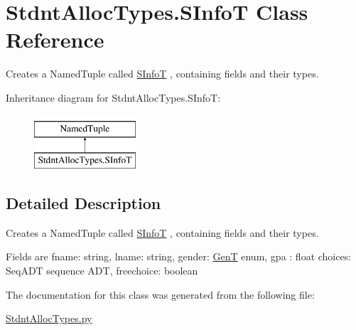 \hypertarget{class_stdnt_alloc_types_1_1_s_info_t}{}\section{Stdnt\+Alloc\+Types.\+S\+InfoT Class Reference}
\label{class_stdnt_alloc_types_1_1_s_info_t}


Creates a Named\+Tuple called \mbox{\hyperlink{class_stdnt_alloc_types_1_1_s_info_t}{S\+InfoT}} , containing fields and their types.  


Inheritance diagram for Stdnt\+Alloc\+Types.\+S\+InfoT\+:\begin{figure}[H]
\begin{center}
\leavevmode
\includegraphics[height=2.000000cm]{class_stdnt_alloc_types_1_1_s_info_t}
\end{center}
\end{figure}


\subsection{Detailed Description}
Creates a Named\+Tuple called \mbox{\hyperlink{class_stdnt_alloc_types_1_1_s_info_t}{S\+InfoT}} , containing fields and their types. 

Fields are fname\+: string, lname\+: string, gender\+: \mbox{\hyperlink{class_stdnt_alloc_types_1_1_gen_t}{GenT}} enum, gpa \+: float choices\+: Seq\+A\+DT sequence A\+DT, freechoice\+: boolean 

The documentation for this class was generated from the following file\+:\begin{DoxyCompactItemize}
\item 
\mbox{\hyperlink{_stdnt_alloc_types_8py}{Stdnt\+Alloc\+Types.\+py}}\end{DoxyCompactItemize}
